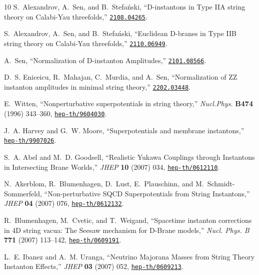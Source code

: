\documentclass[12pt,a4paper]{article}
\begin{document}
\begin{thebibliography}{10}
	S.~Alexandrov, A.~Sen, and B.~Stefa\'nski, ``{D-instantons in Type IIA string
		theory on Calabi-Yau threefolds},''
	\href{http://www.arXiv.org/abs/2108.04265}{{\tt 2108.04265}}.
	
	S.~Alexandrov, A.~Sen, and B.~Stefa\'nski, ``{Euclidean D-branes in Type IIB
		string theory on Calabi-Yau threefolds},''
	\href{http://www.arXiv.org/abs/2110.06949}{{\tt 2110.06949}}.
	
	A.~Sen, ``{Normalization of D-instanton Amplitudes},''
	\href{http://www.arXiv.org/abs/2101.08566}{{\tt 2101.08566}}.
	
	D.~S. Eniceicu, R.~Mahajan, C.~Murdia, and A.~Sen, ``{Normalization of ZZ
		instanton amplitudes in minimal string theory},''
	\href{http://www.arXiv.org/abs/2202.03448}{{\tt 2202.03448}}.
	
	E.~Witten, ``{Nonperturbative superpotentials in string theory},'' {\em
		Nucl.Phys.} {\bf B474} (1996) 343--360,
	\href{http://www.arXiv.org/abs/hep-th/9604030}{{\tt hep-th/9604030}}.
	
	J.~A. Harvey and G.~W. Moore, ``{Superpotentials and membrane instantons},''
	\href{http://www.arXiv.org/abs/hep-th/9907026}{{\tt hep-th/9907026}}.
	
	S.~A. Abel and M.~D. Goodsell, ``{Realistic Yukawa Couplings through Instantons
		in Intersecting Brane Worlds},'' {\em JHEP} {\bf 10} (2007) 034,
	\href{http://www.arXiv.org/abs/hep-th/0612110}{{\tt hep-th/0612110}}.
	
	N.~Akerblom, R.~Blumenhagen, D.~Lust, E.~Plauschinn, and M.~Schmidt-Sommerfeld,
	``{Non-perturbative SQCD Superpotentials from String Instantons},'' {\em
		JHEP} {\bf 04} (2007) 076,
	\href{http://www.arXiv.org/abs/hep-th/0612132}{{\tt hep-th/0612132}}.
	
	R.~Blumenhagen, M.~Cvetic, and T.~Weigand, ``{Spacetime instanton corrections
		in 4D string vacua: The Seesaw mechanism for D-Brane models},'' {\em Nucl.
		Phys. B} {\bf 771} (2007) 113--142,
	\href{http://www.arXiv.org/abs/hep-th/0609191}{{\tt hep-th/0609191}}.
	
	L.~E. Ibanez and A.~M. Uranga, ``{Neutrino Majorana Masses from String Theory
		Instanton Effects},'' {\em JHEP} {\bf 03} (2007) 052,
	\href{http://www.arXiv.org/abs/hep-th/0609213}{{\tt hep-th/0609213}}.
	

\end{thebibliography}
\end{document}

